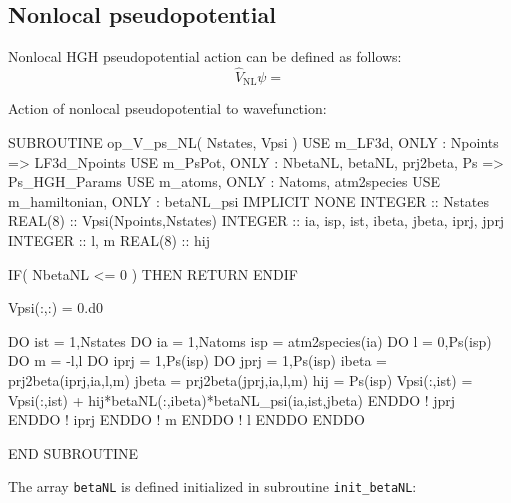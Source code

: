 \subsection{Nonlocal pseudopotential}

Nonlocal HGH pseudopotential action can be defined as follows:
\begin{equation}
\hat{V}_{\mathrm{NL}} \psi =
\end{equation}

Action of nonlocal pseudopotential to wavefunction:

\begin{fortrancode}
SUBROUTINE op_V_ps_NL( Nstates, Vpsi )
  USE m_LF3d, ONLY : Npoints => LF3d_Npoints
  USE m_PsPot, ONLY : NbetaNL, betaNL, prj2beta, Ps => Ps_HGH_Params
  USE m_atoms, ONLY : Natoms, atm2species
  USE m_hamiltonian, ONLY : betaNL_psi
  IMPLICIT NONE
  INTEGER :: Nstates
  REAL(8) :: Vpsi(Npoints,Nstates)
  INTEGER :: ia, isp, ist, ibeta, jbeta, iprj, jprj
  INTEGER :: l, m
  REAL(8) :: hij

  IF( NbetaNL <= 0 ) THEN
    RETURN
  ENDIF

  Vpsi(:,:) = 0.d0

  DO ist = 1,Nstates
    DO ia = 1,Natoms
      isp = atm2species(ia)
      DO l = 0,Ps(isp)%
      DO m = -l,l
        DO iprj = 1,Ps(isp)%
        DO jprj = 1,Ps(isp)%
          ibeta = prj2beta(iprj,ia,l,m)
          jbeta = prj2beta(jprj,ia,l,m)
          hij = Ps(isp)%
          Vpsi(:,ist) = Vpsi(:,ist) + hij*betaNL(:,ibeta)*betaNL_psi(ia,ist,jbeta)
        ENDDO ! jprj
        ENDDO ! iprj
      ENDDO ! m
      ENDDO ! l
    ENDDO
  ENDDO

END SUBROUTINE
\end{fortrancode}

The array {\tt betaNL} is defined initialized in subroutine {\tt init\_betaNL}:

